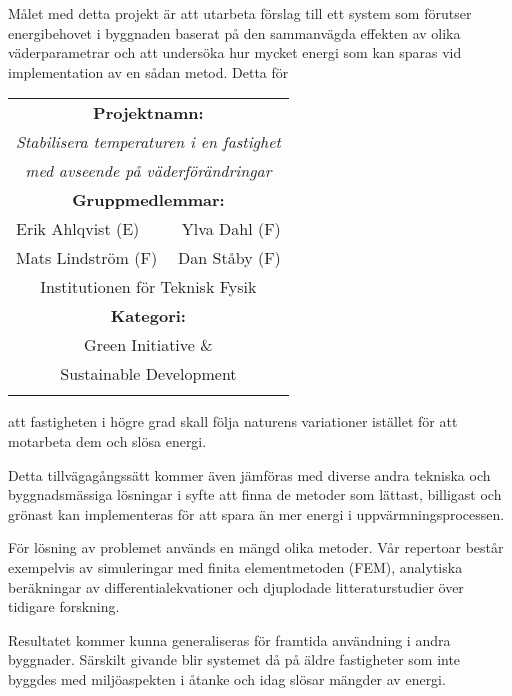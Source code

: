 \documentclass[11pt,a4paper]{article}
\begin{document}
\begin{multicols}{2}
Målet med detta projekt är att utarbeta förslag till ett system som förutser energibehovet i byggnaden baserat på den sammanvägda effekten av olika väderparametrar och att undersöka hur mycket energi som kan sparas vid implementation av en sådan metod. Detta för 
\renewcommand{\arraystretch}{1.2}
\noindent
\resizebox{8cm}{!} {
\begin{tabular}{l r}
\hline \hline
\multicolumn{2}{||c||}{\cellcolor{ForestGreen} \textbf{Projektnamn:}}\\
\multicolumn{2}{||c||}{\cellcolor{ForestGreen} \textit{Stabilisera temperaturen i en fastighet}}\\
\multicolumn{2}{||c||}{\cellcolor{ForestGreen} \textit{med avseende på väderförändringar}} \\
\hline
\multicolumn{2}{||c||}{\cellcolor{ForestGreen} \textbf{Gruppmedlemmar:}} \\
\multicolumn{1}{||l}{\cellcolor{ForestGreen} Erik Ahlqvist (E)} & \multicolumn{1}{r||}{\cellcolor{ForestGreen} Ylva Dahl (F)}\\
\multicolumn{1}{||l}{\cellcolor{ForestGreen} Mats Lindström (F)} & \multicolumn{1}{r||}{\cellcolor{ForestGreen} Dan Ståby (F)}\\ \hline
\multicolumn{2}{||c||}{\cellcolor{ForestGreen} Institutionen för Teknisk Fysik} \\
\hline
\multicolumn{2}{||c||}{\cellcolor{ForestGreen} \textbf{Kategori:}} \\
\multicolumn{2}{||c||}{\cellcolor{ForestGreen} Green Initiative \&}\\
\multicolumn{2}{||c||}{\cellcolor{ForestGreen} Sustainable Development}\\
\hline \hline
& \\
\end{tabular}
}
att fastigheten i högre grad skall följa naturens variationer istället för att motarbeta dem och slösa energi.

Detta tillvägagångssätt kommer även jämföras med diverse andra tekniska och byggnadsmässiga lösningar i syfte att finna de metoder som lättast, billigast och grönast kan implementeras för att spara än mer energi i uppvärmningsprocessen.

För lösning av problemet används en mängd olika metoder. Vår repertoar består exempelvis av simuleringar med finita elementmetoden (FEM), analytiska beräkningar av differentialekvationer och djuplodade litteraturstudier över tidigare forskning.

Resultatet kommer kunna generaliseras för framtida användning i andra byggnader. Särskilt givande blir systemet då på äldre fastigheter som inte byggdes med miljöaspekten i åtanke och idag slösar mängder av energi.

\end{multicols}
\end{document}
